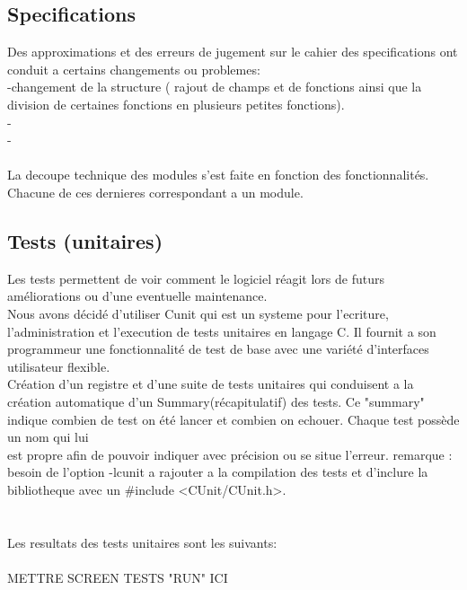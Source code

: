 \documentclass[a4]{article}
\begin{document}
	
		
		\subsection{Specifications}
		Des approximations et des erreurs de jugement sur le cahier des specifications ont conduit a certains changements ou problemes:\\
		-changement de la structure ( rajout de champs et de fonctions ainsi que la division de certaines fonctions en plusieurs
		 petites fonctions).\\
		-\\
		-\\ \\
		
		
		
		

		La decoupe technique des modules s'est faite en fonction des fonctionnalités.
		 Chacune de ces dernieres correspondant a un module.
		
		\subsection{Tests (unitaires)}
		
Les tests permettent de voir comment le logiciel réagit lors de futurs améliorations ou d'une eventuelle maintenance. \\ 
 
Nous avons décidé d'utiliser Cunit qui est un systeme pour l'ecriture, l'administration et l'execution de tests unitaires
en langage C. Il fournit a son programmeur une fonctionnalité de test de base avec une variété d'interfaces utilisateur flexible.\\
Création d'un registre et d'une suite de tests unitaires qui conduisent a la création automatique d'un Summary(récapitulatif)
des tests. Ce "summary" indique combien de test on été lancer et combien on echouer. Chaque test possède un nom qui lui\\
est propre afin de pouvoir indiquer avec précision ou se situe l'erreur.
remarque : besoin de l'option -lcunit a rajouter a la compilation des tests et d'inclure la bibliotheque avec un
\#include <CUnit/CUnit.h>.\\ \\ \\ 

Les resultats des tests unitaires sont les suivants:\\ \\ 
METTRE SCREEN TESTS "RUN" ICI \\ \\
\end{document}
